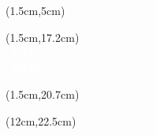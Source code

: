 \begin{latin}
    \fontsize{13.2pt}{15.8pt}\selectfont

    \begin{textblock*}{12cm}(1.5cm,5cm)
        \textcolor{white}{\textbf{{\LatinDegreeAbbr} {\LatinType}}}

        \vspace{\baselineskip}
        \textcolor{white}{\large \textbf{\LatinTitle}}

        \vspace{\baselineskip}
        \textcolor{white}{\textbf{\LatinName}}
    \end{textblock*}

    \begin{textblock*}{12cm}(1.5cm,17.2cm)
        \textcolor{white}{Supervised by \\ \textbf{{\LatinSupervisor}, PhD \\ {\LatinSupervisorB}, PhD}}
    \end{textblock*}

    \begin{textblock*}{12cm}(1.5cm,20.7cm)
        \textcolor{white}{{\LatinSchool} - {\LatinDepartment}}
    \end{textblock*}

    \begin{textblock*}{3cm}(12cm,22.5cm)
        \textcolor{BlueGray}{\normalsize \textbf{\LatinDate}}
    \end{textblock*}
\end{latin}

